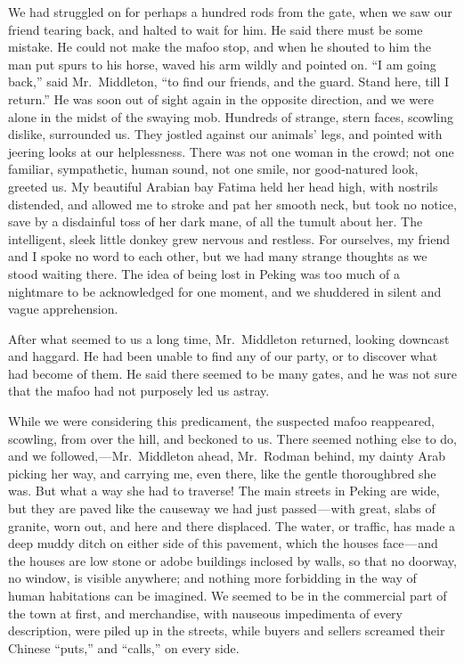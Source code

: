 \documentclass[12pt]{book}
\begin{document}
We had struggled on for perhaps a hundred rods from the gate, when we saw
our friend tearing back, and halted to wait for him. He said there must be some
mistake. He could not make the mafoo stop, and when he shouted to him the man
put spurs to his horse, waved his arm wildly and pointed on. “I am going back,”
said Mr.~Middleton, “to find our friends, and the guard. Stand here, till I return.”
He was soon out of sight again in the opposite direction, and we were alone in
the midst of the swaying mob. Hundreds of strange, stern faces, scowling dislike,
surrounded us. They jostled against our animals’ legs, and pointed with jeering
looks at our helplessness. There was not one woman in the crowd; not one familiar,
sympathetic, human sound, not one smile, nor good‐natured look, greeted us.
My beautiful Arabian bay Fatima held her head high, with nostrils distended,
and allowed me to stroke and pat her smooth neck, but took no notice, save by a
disdainful toss of her dark mane, of all the tumult about her. The intelligent, sleek
little donkey grew nervous and restless. For ourselves, my friend and I spoke no
word to each other, but we had many strange thoughts as we stood waiting there.
The idea of being lost in Peking was too much of a nightmare to be acknowledged
for one moment, and we shuddered in silent and vague apprehension.

After what seemed to us a long time, Mr.~Middleton returned, looking downcast and haggard. He had been unable to find any of our party, or to discover
what had become of them. He said there seemed to be many gates, and he was
not sure that the mafoo had not purposely led us astray.

While we were considering this predicament, the suspected mafoo reappeared,
scowling, from over the hill, and beckoned to us. There seemed nothing else to do,
and we followed, — Mr.~Middleton ahead, Mr.~Rodman behind, my dainty Arab
picking her way, and carrying me, even there, like the gentle thoroughbred she
was. But what a way she had to traverse! The main streets in Peking are wide, but
they are paved like the causeway we had just passed — with great, slabs of granite,
worn out, and here and there displaced. The water, or traffic, has made a deep
muddy ditch on either side of this pavement, which the houses face — and the
houses are low stone or adobe buildings inclosed by walls, so that no doorway, no
window, is visible anywhere; and nothing more forbidding in the way of human
habitations can be imagined. We seemed to be in the commercial part of the town
at first, and merchandise, with nauseous impedimenta of every description, were
piled up in the streets, while buyers and sellers screamed their Chinese “puts,”
and “calls,” on every side.
\end{document}
